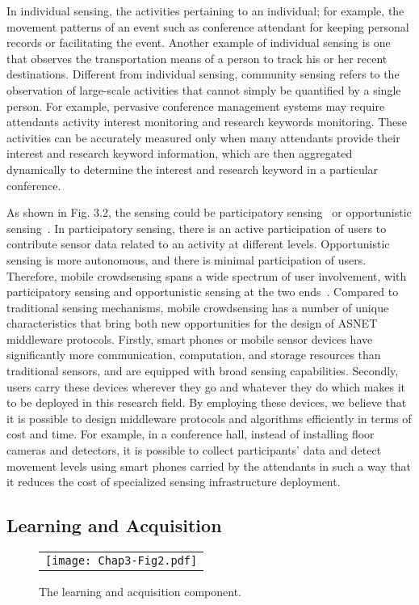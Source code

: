 In individual sensing, the activities pertaining to an individual; for example, the movement patterns of an event such as conference attendant for keeping personal records or facilitating the event. Another example of individual sensing is one that observes the transportation means of a person to track his or her recent destinations. Different from individual sensing, community sensing refers to the observation of large-scale activities that cannot simply be quantified by a single person. For example, pervasive conference management systems may require attendants activity interest monitoring and research keywords monitoring. These activities can be accurately measured only when many attendants provide their interest and research keyword information, which are then aggregated dynamically to determine the interest and research keyword in a particular conference.

As shown in Fig. 3.2, the sensing could be participatory sensing~\cite{OOmokaro2012} or opportunistic sensing~\cite{GSTuncay2013}. In participatory sensing, there is an active participation of users to contribute sensor data related to an activity at different levels. Opportunistic sensing is more autonomous, and there is minimal participation of users. Therefore, mobile crowdsensing spans a wide spectrum of user involvement, with participatory sensing and opportunistic sensing at the two ends~\cite{RKGanti2011}. Compared to traditional sensing mechanisms, mobile crowdsensing has a number of unique characteristics that bring both new opportunities for the design of ASNET middleware protocols. Firstly, smart phones or mobile sensor devices have significantly more communication, computation, and storage resources than traditional sensors, and are equipped with broad sensing capabilities. Secondly, users carry these devices wherever they go and whatever they do which makes it to be deployed in this research field. By employing these devices, we believe that it is possible to design middleware protocols and algorithms efficiently in terms of cost and time. For example, in a conference hall, instead of installing floor cameras and detectors, it is possible to collect participants' data and detect movement levels using smart phones carried by the attendants in such a way that it reduces the cost of specialized sensing infrastructure deployment.

\subsection{Learning and Acquisition}\label{Chap3_02_02}
\begin{figure}[t]
\begin{center}
  \begin{tabular}{c}
  \texttt{[image: Chap3-Fig2.pdf]}
  \end{tabular}
  \caption{The learning and acquisition component.}
\end{center}
\end{figure}

